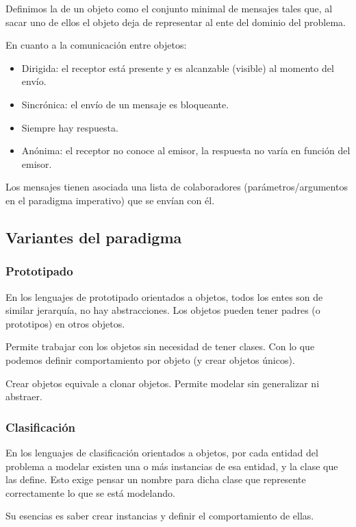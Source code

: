  Definimos la  de un objeto como el conjunto minimal de mensajes tales que, al sacar uno de ellos el objeto deja de representar al ente del dominio del problema.

 En cuanto a la comunicación entre objetos:
\begin{itemize}
  \item Dirigida: el receptor está presente y es alcanzable (visible) al momento del envío.
  \item Sincrónica: el envío de un mensaje es bloqueante.
  \item Siempre hay respuesta.
  \item Anónima: el receptor no conoce al emisor, la respuesta no varía en función del emisor.
\end{itemize}

Los mensajes tienen asociada una lista de colaboradores (parámetros/argumentos en el paradigma imperativo) que se envían con él.

\subsection{Variantes del paradigma}
\subsubsection{Prototipado}

En los lenguajes de prototipado orientados a objetos, todos los entes son de similar jerarquía, no hay abstracciones. Los objetos pueden tener padres (o prototipos) en otros objetos.

Permite trabajar con los objetos sin necesidad de tener clases. Con lo que podemos definir comportamiento por objeto (y crear objetos únicos).

Crear objetos equivale a clonar objetos. Permite modelar sin generalizar ni abstraer.

\subsubsection{Clasificación}

En los lenguajes de clasificación orientados a objetos, por cada entidad del problema a modelar existen una o más instancias de esa entidad, y la clase que las define. Esto exige pensar un nombre para dicha clase que represente correctamente lo que se está modelando.

Su esencias es saber crear instancias y definir el comportamiento de ellas.

